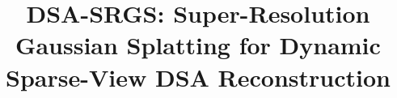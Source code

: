 \documentclass[runningheads]{llncs}
\begin{document}
%
\title{DSA-SRGS: Super-Resolution Gaussian Splatting for Dynamic Sparse-View DSA Reconstruction}
%

\end{document}
